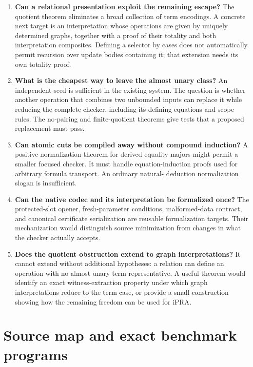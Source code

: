 \documentclass[11pt]{article}
\begin{document}
\begin{enumerate}
\item \textbf{Can a relational presentation exploit the remaining escape?}
The quotient theorem eliminates a broad collection of term encodings.
A concrete next target is an interpretation whose operations are given
by uniquely determined graphs, together with a proof of their totality
and both interpretation composites. Defining a selector by cases does
not automatically permit recursion over update bodies containing it;
that extension needs its own totality proof.

\item \textbf{What is the cheapest way to leave the almost unary class?}
An independent seed is sufficient in the existing system. The question
is whether another operation that combines two unbounded inputs can
replace it while reducing the complete checker, including its defining
equations and scope rules. The no-pairing and finite-quotient theorems
give tests that a proposed replacement must pass.

\item \textbf{Can atomic cuts be compiled away without compound induction?}
A positive normalization theorem for derived equality majors might
permit a smaller focused checker. It must handle equation-induction
proofs used for arbitrary formula transport. An ordinary natural-
deduction normalization slogan is insufficient.

\item \textbf{Can the native codec and its interpretation be formalized once?}
The protected-slot opener, fresh-parameter conditions, malformed-data
contract, and canonical certificate serialization are reusable
formalization targets. Their mechanization would distinguish source
minimization from changes in what the checker actually accepts.

\item \textbf{Does the quotient obstruction extend to graph interpretations?}
It cannot extend without additional hypotheses: a relation can define
an operation with no almost-unary term representative. A useful theorem
would identify an exact witness-extraction property under which graph
interpretations reduce to the term case, or provide a small construction
showing how the remaining freedom can be used for iPRA.
\end{enumerate}

\appendix
\section{Source map and exact benchmark programs}
\end{document}
